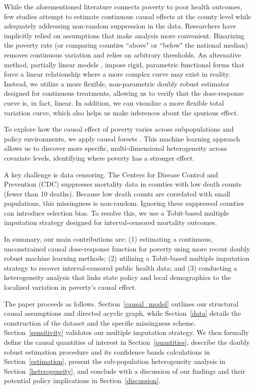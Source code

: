 \documentclass{article}
\theoremstyle{plain}
\theoremstyle{definition}
\theoremstyle{remark}
\begin{document}
While the aforementioned literature connects poverty to poor health outcomes, few studies 
attempt to estimate continuous causal effects at the county level while adequately 
addressing non-random suppression in the data. Researchers have implicitly relied on 
assumptions that make analysis more convenient. Binarizing the poverty rate (or 
comparing counties ``above" or ``below" the national median) removes 
continuous variation and relies on arbitrary thresholds. An alternative method,
partially linear models \citep{chernozhukov2018double}, impose rigid, parametric 
functional forms that force a linear relationship where a more complex curve may
exist in reality. Instead, we utilize a more flexible, non-parametric doubly robust 
estimator \citep{kennedy2017non} designed for continuous treatments, allowing 
us to verify that the dose-response curve is, in fact, linear. In addition, we can visualize a more flexible total variation curve, which also helps us make inferences about the spurious effect.


To explore how the causal effect of poverty varies across subpopulations 
and policy environments, we apply causal forests \citep{wager2018estimation, athey2019generalized}. 
This machine learning approach allows us to discover more specific, multi-dimensional 
heterogeneity across covariate levels, identifying where poverty has a stronger effect.

A key challenge is data 
censoring. The Centers for Disease Control and 
Prevention (CDC) suppresses mortality data in counties with low death counts (fewer than 10 deaths). Because low death counts are correlated 
with small populations, this missingness is non-random. Ignoring 
these suppressed counties can introduce selection bias. To resolve this, we use a Tobit-based 
multiple imputation strategy designed for interval-censored mortality outcomes.

In summary, our main contributions are: (1) estimating 
a continuous, unconstrained causal dose-response function for poverty using more recent
doubly robust machine learning methods; (2) utilizing a
Tobit-based multiple imputation strategy to recover interval-censored public health 
data; and (3) conducting a  heterogeneity analysis that links 
state policy and local demographics to the localized variation in poverty's causal effect.

The paper proceeds as follows. Section~\ref{causal_model} outlines our structural 
causal assumptions and directed acyclic graph, while Section~\ref{data} details 
the construction of the dataset and the specific missingness scheme. Section~\ref{sensitivity} 
validates our multiple imputation strategy. We then formally define the causal 
quantities of interest in Section~\ref{quantities}, describe the doubly robust 
estimation procedure and its confidence bands calculations in Section~\ref{estimation}, 
present the sub-population heterogeneity analysis in Section~\ref{heterogeneity}, 
and conclude with a discussion of our findings and their potential policy implications 
in Section~\ref{discussion}.
\end{document}
